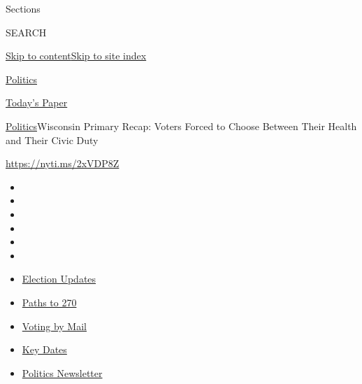 Sections

SEARCH

\protect\hyperlink{site-content}{Skip to
content}\protect\hyperlink{site-index}{Skip to site index}

\href{https://www.nytimes3xbfgragh.onion/section/politics}{Politics}

\href{https://myaccount.nytimes3xbfgragh.onion/auth/login?response_type=cookie\&client_id=vi}{}

\href{https://www.nytimes3xbfgragh.onion/section/todayspaper}{Today's
Paper}

\href{/section/politics}{Politics}\textbar{}Wisconsin Primary Recap:
Voters Forced to Choose Between Their Health and Their Civic Duty

\url{https://nyti.ms/2xVDP8Z}

\begin{itemize}
\item
\item
\item
\item
\item
\item
\end{itemize}

\begin{itemize}
\item
  \href{https://www.nytimes3xbfgragh.onion/live/2020/09/08/us/trump-vs-biden?action=click\&pgtype=Article\&state=default\&region=TOP_BANNER\&context=storylines_menu}{Election
  Updates}
\item
  \href{https://www.nytimes3xbfgragh.onion/interactive/2020/us/elections/election-states-biden-trump.html?action=click\&pgtype=Article\&state=default\&region=TOP_BANNER\&context=storylines_menu}{Paths
  to 270}
\item
  \href{https://www.nytimes3xbfgragh.onion/interactive/2020/08/31/us/politics/vote-by-mail-deadlines.html?action=click\&pgtype=Article\&state=default\&region=TOP_BANNER\&context=storylines_menu}{Voting
  by Mail}
\item
  \href{https://www.nytimes3xbfgragh.onion/interactive/2019/us/elections/2020-presidential-election-calendar.html?action=click\&pgtype=Article\&state=default\&region=TOP_BANNER\&context=storylines_menu}{Key
  Dates}
\item
  \href{https://www.nytimes3xbfgragh.onion/newsletters/politics?action=click\&pgtype=Article\&state=default\&region=TOP_BANNER\&context=storylines_menu}{Politics
  Newsletter}
\end{itemize}

